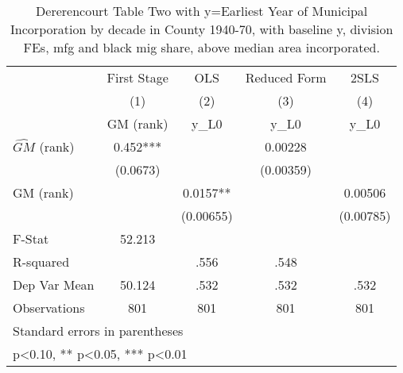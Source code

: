 \begin{table}[htbp]\centering
\def\sym#1{\ifmmode^{#1}\else\(^{#1}\)\fi}
\caption{Dererencourt Table Two with y=Earliest Year of Municipal Incorporation by decade in County 1940-70, with baseline y, division FEs, mfg and black mig share, above median area incorporated.}
\begin{tabular}{l*{4}{c}}
\toprule
                    & First Stage   &         OLS   &Reduced Form   &        2SLS   \\
                    &\multicolumn{1}{c}{(1)}&\multicolumn{1}{c}{(2)}&\multicolumn{1}{c}{(3)}&\multicolumn{1}{c}{(4)}\\
                    &\multicolumn{1}{c}{GM  (rank)}&\multicolumn{1}{c}{y\_L0}&\multicolumn{1}{c}{y\_L0}&\multicolumn{1}{c}{y\_L0}\\
\midrule
$\hat{GM}$ (rank)   &       0.452***&               &     0.00228   &               \\
                    &    (0.0673)   &               &   (0.00359)   &               \\
\addlinespace
GM  (rank)          &               &      0.0157** &               &     0.00506   \\
                    &               &   (0.00655)   &               &   (0.00785)   \\
\midrule
F-Stat              &      52.213   &               &               &               \\
R-squared           &               &        .556   &        .548   &               \\
Dep Var Mean        &      50.124   &        .532   &        .532   &        .532   \\
Observations        &         801   &         801   &         801   &         801   \\
\bottomrule
\multicolumn{5}{l}{\footnotesize Standard errors in parentheses}\\
\multicolumn{5}{l}{\footnotesize * p<0.10, ** p<0.05, *** p<0.01}\\
\end{tabular}
\end{table}
